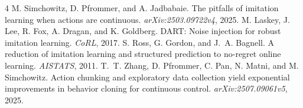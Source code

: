 \documentclass{l4dc2026}
\begin{document}
\clearpage
\begin{thebibliography}{4}
M. Simchowitz, D. Pfrommer, and A. Jadbabaie.
The pitfalls of imitation learning when actions are continuous.
\emph{arXiv:2503.09722v4}, 2025.
M. Laskey, J. Lee, R. Fox, A. Dragan, and K. Goldberg.
DART: Noise injection for robust imitation learning. \emph{CoRL}, 2017.
S. Ross, G. Gordon, and J.~A. Bagnell.
A reduction of imitation learning and structured prediction to no-regret online learning. \emph{AISTATS}, 2011.
T.~T. Zhang, D. Pfrommer, C. Pan, N. Matni, and M. Simchowitz.
Action chunking and exploratory data collection yield exponential improvements in behavior cloning for continuous control. \emph{arXiv:2507.09061v5}, 2025.
\end{thebibliography}
\end{document}
